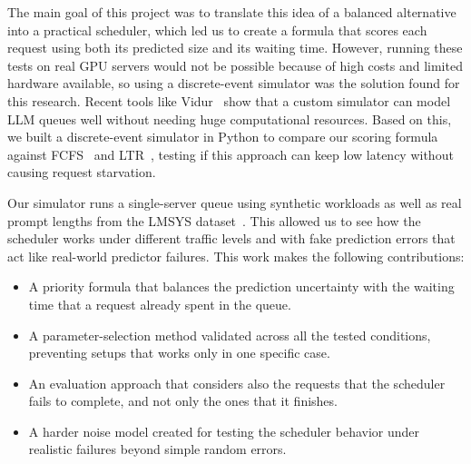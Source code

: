 The main goal of this project was to translate this idea of a balanced alternative into a practical scheduler, which led us to create a formula that scores each request using both its predicted size and its waiting time. However, running these tests on real GPU servers would not be possible because of high costs and limited hardware available, so using a discrete-event simulator was the solution found for this research. Recent tools like Vidur~\cite{agrawal2024vidur} show that a custom simulator can model LLM queues well without needing huge computational resources. Based on this, we built a discrete-event simulator in Python to compare our scoring formula against FCFS~\cite{yu2022orca} and LTR~\cite{kumar2024latency, fu2024ltr}, testing if this approach can keep low latency without causing request starvation. 

Our simulator runs a single-server queue using synthetic workloads as well as real prompt lengths from the LMSYS dataset~\cite{zheng2024lmsys}. This allowed us to see how the scheduler works under different traffic levels and with fake prediction errors that act like real-world predictor failures. This work makes the following contributions:

\begin{itemize}
    \item A priority formula that balances the prediction uncertainty with the waiting time that a request already spent in the queue.
    \item A parameter-selection method validated across all the tested conditions, preventing setups that works only in one specific case.
    \item An evaluation approach that considers also the requests that the scheduler fails to complete, and not only the ones that it finishes.
    \item A harder noise model created for testing the scheduler behavior under realistic failures beyond simple random errors.
\end{itemize}